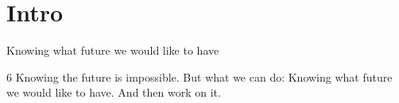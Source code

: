 
\section{Intro}

\begin{frame}{Knowing what future we would like to have}
  \begin{comicquote}{6}
    Knowing the future is impossible. But what we can do: Knowing what
    future we would like to have. And then work on it.
  \end{comicquote}
\end{frame}

